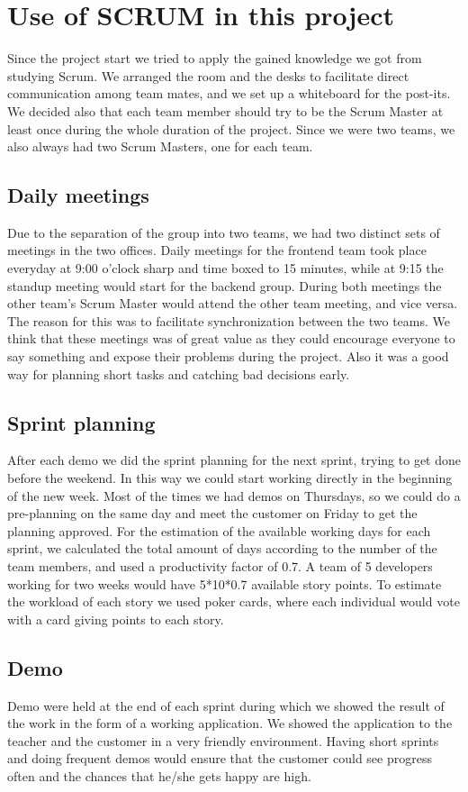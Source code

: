 \section{Use of SCRUM in this project}
Since the project start we tried to apply the gained knowledge we got from studying Scrum.
We arranged the room and the desks to facilitate direct communication among team mates,
and we set up a whiteboard for the post-its. We decided also that each team member should try to
be the Scrum Master at least once during the whole duration of the project.
Since we were two teams, we also always had two Scrum Masters, one for each team.

\subsection{Daily meetings}
Due to the separation of the group into two teams, we had two distinct sets of meetings in the two offices.
Daily meetings for the frontend team took place everyday at 9:00 o'clock sharp and time boxed to 15 minutes,
while at 9:15 the standup meeting would start for the backend group.
During both meetings the other team's Scrum Master would attend the other team meeting, and vice versa.
The reason for this was to facilitate synchronization between the two teams.
We think that these meetings was of great value as they could encourage everyone to say something and
expose their problems during the project. Also it was a good way for planning short tasks and catching bad decisions
early.

\subsection{Sprint planning}
After each demo we did the sprint planning for the next sprint, trying to get done before the weekend.
In this way we could start working directly in the beginning of the new week. Most of the times we had demos on Thursdays,
so we could do a pre-planning on the same day and meet the customer on Friday to get the planning approved.
For the estimation of the available working days for each sprint, we calculated the total amount of days
according to the number of the team members, and used a productivity factor of 0.7. A team of 5 developers working
for two weeks would have 5*10*0.7 available story points. To estimate the workload of each story we used poker cards,
where each individual would vote with a card giving points to each story.

\subsection{Demo}
Demo were held at the end of each sprint during which we showed the result of the work in the form of a working application.
We showed the application to the teacher and the customer in a very friendly environment. Having short sprints and doing frequent
demos would ensure that the customer could see progress often and the chances that he/she gets happy are high.


